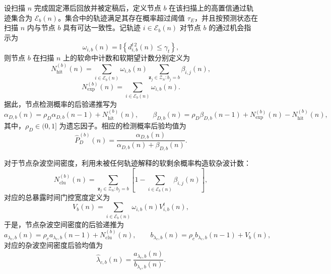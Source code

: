\documentclass{xdupgthesis}
\begin{document}
设扫描 $n$ 完成固定滞后回放并被定稿后，定义节点 $b$ 在该扫描上的高置信通过轨迹集合为 $\mathcal E_b(n)$。集合中的轨迹满足其存在概率超过阈值 $\tau_E$，并且按预测状态在扫描 $n$ 内与节点 $b$ 具有可达一致性。记轨迹 $i\in\mathcal E_b(n)$ 对节点 $b$ 的通过机会指示为
\begin{equation}
	\omega_{i,b}(n)=\mathbb I\left\{d^{t\,2}_{i,b}(n)\le \gamma_t\right\},
	\label{eq:ch3_pass_indicator}
\end{equation}
则节点 $b$ 在扫描 $n$ 上的软命中计数和软期望计数分别定义为
\begin{equation}
	N_{\mathrm{hit}}^{(b)}(n)
	=
	\sum_{i\in\mathcal E_b(n)}
	\omega_{i,b}(n)
	\sum_{\mathbf z_j\in \mathcal Z_n:b_j=b}
	\beta_{i,j}(n),
	\label{eq:ch3_soft_hit}
\end{equation}
\begin{equation}
	N_{\mathrm{exp}}^{(b)}(n)
	=
	\sum_{i\in\mathcal E_b(n)}
	\omega_{i,b}(n).
	\label{eq:ch3_soft_exp}
\end{equation}
据此，节点检测概率的后验递推写为
\begin{equation}
	\alpha_{D,b}(n)=\rho_D\alpha_{D,b}(n-1)+N_{\mathrm{hit}}^{(b)}(n),
	\qquad
	\beta_{D,b}(n)=\rho_D\beta_{D,b}(n-1)+N_{\mathrm{exp}}^{(b)}(n)-N_{\mathrm{hit}}^{(b)}(n),
	\label{eq:ch3_beta_update}
\end{equation}
其中，$\rho_D\in(0,1]$ 为遗忘因子。相应的检测概率后验均值为
\begin{equation}
	\hat P_D^{(b)}(n)=\frac{\alpha_{D,b}(n)}{\alpha_{D,b}(n)+\beta_{D,b}(n)}.
	\label{eq:ch3_pD_mean}
\end{equation}

对于节点杂波空间密度，利用未被任何轨迹解释的软剩余概率构造软杂波计数：
\begin{equation}
	N_{\mathrm{clu}}^{(b)}(n)
	=
	\sum_{\mathbf z_j\in \mathcal Z_n:b_j=b}
	\left[1-\sum_{i\in\mathcal E_b(n)}\beta_{i,j}(n)\right],
	\label{eq:ch3_soft_clutter}
\end{equation}
对应的总暴露时间门控宽度定义为
\begin{equation}
	V_b(n)=
	\sum_{i\in\mathcal E_b(n)}
	\omega_{i,b}(n)V^{t}_{i,b}(n),
	\label{eq:ch3_exposure_volume}
\end{equation}
于是，节点杂波空间密度的后验递推为
\begin{equation}
	a_{\lambda_c,b}(n)=\rho_c a_{\lambda_c,b}(n-1)+N_{\mathrm{clu}}^{(b)}(n),
	\qquad
	b_{\lambda_c,b}(n)=\rho_c b_{\lambda_c,b}(n-1)+V_b(n),
	\label{eq:ch3_kappa_update}
\end{equation}
对应的杂波空间密度后验均值为
\begin{equation}
	\hat\lambda_{c,b}(n)=\frac{a_{\lambda_c,b}(n)}{b_{\lambda_c,b}(n)}.
	\label{eq:ch3_kappa_mean_v2}
\end{equation}
\end{document}
